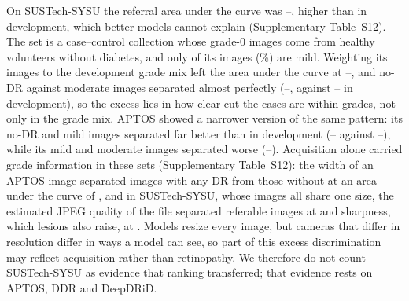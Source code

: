 On SUSTech-SYSU the referral area under the curve was --,
higher than in development, which better models cannot explain (Supplementary Table~S12). The set is
a case--control collection whose grade-0 images come from healthy volunteers without diabetes, and
only  of its images (\%) are mild. Weighting its images
to the development grade mix left the area under the curve at
--, and no-DR against moderate images
separated almost perfectly (--, against
-- in development), so the excess lies in how clear-cut
the cases are within grades, not only in the grade mix. APTOS showed a narrower version of the same
pattern: its no-DR and mild images separated far better than in development
(-- against --),
while its mild and moderate images separated worse (--).
Acquisition alone carried grade information in these sets (Supplementary Table~S12): the width
of an APTOS image separated images with any DR from those without at an area under the curve of
, and in SUSTech-SYSU, whose images all share one size, the estimated JPEG
quality of the file separated referable images at  and sharpness,
which lesions also raise, at . Models resize every image, but
cameras that differ in resolution differ in ways a model can see, so part of this excess
discrimination may reflect acquisition rather than retinopathy.
We therefore do not count SUSTech-SYSU as evidence that ranking transferred; that evidence rests on
APTOS, DDR and DeepDRiD.


